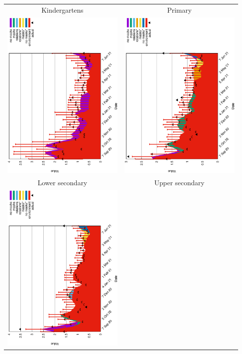 \documentclass{letter}
\begin{document}
\begin{center}
\begin{tabular}{cc}
Kindergartens & Primary  \\
\includegraphics[angle=270,width=6cm]{rho1.eps} &\includegraphics[angle=270,width=6cm]{rho2.eps}\\ 
 Lower secondary & Upper secondary \\
\includegraphics[angle=270,width=6cm]{rho3.eps} & 

\end{tabular}
\end{center}
\end{document}
